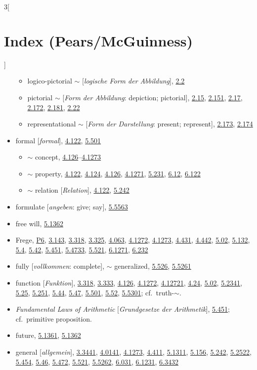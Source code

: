 \documentclass[oneside,openany,12pt]{book}
\newcommand{\indexentry}[1]{\item #1}
\newcommand{\indexsubentry}[1]{\begin{itemize} \item #1 \end{itemize}}
\newcommand{\indexref}[1]{\hyperlink{prop#1}{#1}}
\newcommand{\indexgap}{\bigskip}
\begin{document}
\begin{multicols}{3}[\section*{Index (Pears/McGuinness)}]
\begin{itemize}
   \indexsubentry{logico-pictorial $\sim$ [\textit{logische Form der Abbildung}], \indexref{2.2}}

   \indexsubentry{pictorial $\sim$ [\textit{Form der Abbildung}: depiction; pictorial], \indexref{2.15}, \indexref{2.151}, \indexref{2.17}, \indexref{2.172}, \indexref{2.181}, \indexref{2.22}}

   \indexsubentry{representational $\sim$ [\textit{Form der Darstellung}: present; represent], \indexref{2.173}, \indexref{2.174}}

\indexentry{formal [\textit{formal}], \indexref{4.122}, \indexref{5.501}}

   \indexsubentry{$\sim$ concept, \indexref{4.126}--\indexref{4.1273}}

   \indexsubentry{$\sim$ property, \indexref{4.122}, \indexref{4.124}, \indexref{4.126}, \indexref{4.1271}, \indexref{5.231}, \indexref{6.12}, \indexref{6.122}}

   \indexsubentry{$\sim$ relation [\textit{Relation}], \indexref{4.122}, \indexref{5.242}}

\indexentry{formulate [\textit{angeben}: give; say], \indexref{5.5563}}

\indexentry{free will, \indexref{5.1362}}

\indexentry{Frege, \hyperlink{pref6}{P6}, \indexref{3.143}, \indexref{3.318}, \indexref{3.325}, \indexref{4.063}, \indexref{4.1272}, \indexref{4.1273}, \indexref{4.431}, \indexref{4.442}, \indexref{5.02}, \indexref{5.132}, \indexref{5.4}, \indexref{5.42}, \indexref{5.451}, \indexref{5.4733}, \indexref{5.521}, \indexref{6.1271}, \indexref{6.232}}

\indexentry{fully [\textit{vollkommen}: complete], $\sim$ generalized, \indexref{5.526}, \indexref{5.5261}}

\indexentry{function [\textit{Funktion}], \indexref{3.318}, \indexref{3.333}, \indexref{4.126}, \indexref{4.1272}, \indexref{4.12721}, \indexref{4.24}, \indexref{5.02}, \indexref{5.2341}, \indexref{5.25}, \indexref{5.251}, \indexref{5.44}, \indexref{5.47}, \indexref{5.501}, \indexref{5.52}, \indexref{5.5301}; cf.\ truth-$\sim$.}

\indexentry{\textit{Fundamental Laws of Arithmetic} [\textit{Grundgesetze der Arithmetik}], \indexref{5.451}; cf.\ primitive proposition.}

\indexentry{future, \indexref{5.1361}, \indexref{5.1362}}

\indexgap

\indexentry{general [\textit{allgemein}], \indexref{3.3441}, \indexref{4.0141}, \indexref{4.1273}, \indexref{4.411}, \indexref{5.1311}, \indexref{5.156}, \indexref{5.242}, \indexref{5.2522}, \indexref{5.454}, \indexref{5.46}, \indexref{5.472}, \indexref{5.521}, \indexref{5.5262}, \indexref{6.031}, \indexref{6.1231}, \indexref{6.3432}}


\end{itemize}
\end{multicols}
\end{document}
